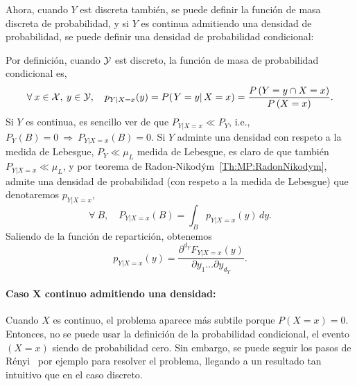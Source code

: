{Ahora, cuando $Y$ est discreta tambi\'en,  se puede definir la funci\'on de masa
discreta  de probabilidad,  y  si $Y$  es  continua admitiendo  una densidad  de
probabilidad, se puede definir una densidad de probabilidad condicional:
%
\begin{definicion}
  Por  definici\'on,  cuando  $\mathcal{Y}$  est   discreto,  la  funci\'on  de  masa  de
  probabilidad condicional es,
  \[
  \forall \:  x \in  \mathcal{X}, \: y  \in \mathcal{Y}, \quad  p_{Y|X=x}(y) =  P( \left. Y  = y
  \right|  X =  x  ) =  \frac{P\left(Y  = y  \cap X  =  x \right)}{P\left(X  =
      x\right)}.
  \]
  Si $Y$ es continua, es sencillo  ver de que $P_{Y|X=x} \ll P_Y$, i.e., $P_Y(B)
  = 0  \: \Rightarrow  \: P_{Y|X=x}(B) =  0$.  Si  $Y$ adminte una  densidad con
  respeto a la medida de Lebesgue,  $P_Y \ll \mu_L$ medida de Lebesgue, es claro
  de    que   tambi\'en   $P_{Y|X=x}    \ll   \mu_L$,    y   por    teorema   de
  Radon-Nikod\'ym~\ref{Th:MP:RadonNikodym}, admite  una densidad de probabilidad
  (con respeto a la medida de Lebesgue) que denotaremos $p_{Y|X=x}$,
  \[
  \forall \: B, \quad P_{Y|X=x}(B) = \int_B p_{Y|X=x}(y) \, dy.
  \]
  Saliendo de la funci\'on de repartici\'on, obtenemos
  \[
  p_{Y|X=x}(y) = \frac{\partial^{d_Y} F_{Y|X=x}(y)}{\partial y_1 \ldots \partial
    y_{d_Y}}.
  \]
\end{definicion}



\paragraph{Caso $\boldsymbol{X}$ continuo admitiendo una densidad:}
Cuando  $X$ es  continuo, el  problema aparece  m\'as subtile  porque  $P(X=x) =
0$. Entonces, no  se puede usar la definici\'on  de la probabilidad condicional,
el evento $(X=x)$ siendo de probabilidad cero.  Sin embargo, se puede seguir los
pasos  de  R\'enyi~\cite[Cap.~5]{Ren} por  ejemplo  para  resolver el  problema,
llegando a un resultado tan intuitivo que en el caso discreto.

}
